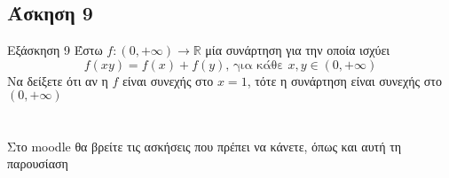 \documentclass[greek]{beamer}
\begin{document}
\subsection{Άσκηση 9}
\begin{frame}[label=Άσκηση9]{Εξάσκηση 9}
        Έστω $f:(0,+\infty)\to\mathbb{R}$ μία συνάρτηση για την οποία ισχύει
        $$f(xy)=f(x)+f(y) \text{, για κάθε } x,y\in(0,+\infty)$$
        Να δείξετε ότι αν η $f$ είναι συνεχής στο $x=1$, τότε η συνάρτηση είναι συνεχής στο $(0,+\infty)$

\end{frame}

\section{}
\begin{frame}
        Στο moodle θα βρείτε τις ασκήσεις που πρέπει να κάνετε, όπως και αυτή τη παρουσίαση
\end{frame}
\end{document}
